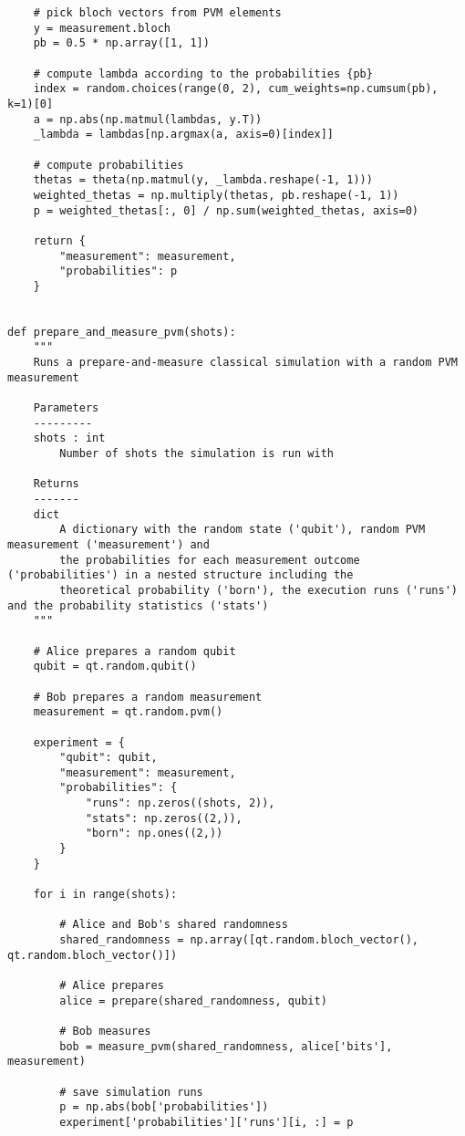\begin{verbatim}
    # pick bloch vectors from PVM elements
    y = measurement.bloch
    pb = 0.5 * np.array([1, 1])

    # compute lambda according to the probabilities {pb}
    index = random.choices(range(0, 2), cum_weights=np.cumsum(pb), k=1)[0]
    a = np.abs(np.matmul(lambdas, y.T))
    _lambda = lambdas[np.argmax(a, axis=0)[index]]

    # compute probabilities
    thetas = theta(np.matmul(y, _lambda.reshape(-1, 1)))
    weighted_thetas = np.multiply(thetas, pb.reshape(-1, 1))
    p = weighted_thetas[:, 0] / np.sum(weighted_thetas, axis=0)

    return {
        "measurement": measurement,
        "probabilities": p
    }


def prepare_and_measure_pvm(shots):
    """
    Runs a prepare-and-measure classical simulation with a random PVM measurement

    Parameters
    ---------
    shots : int
        Number of shots the simulation is run with

    Returns
    -------
    dict
        A dictionary with the random state ('qubit'), random PVM measurement ('measurement') and
        the probabilities for each measurement outcome ('probabilities') in a nested structure including the
        theoretical probability ('born'), the execution runs ('runs') and the probability statistics ('stats')
    """

    # Alice prepares a random qubit
    qubit = qt.random.qubit()

    # Bob prepares a random measurement
    measurement = qt.random.pvm()

    experiment = {
        "qubit": qubit,
        "measurement": measurement,
        "probabilities": {
            "runs": np.zeros((shots, 2)),
            "stats": np.zeros((2,)),
            "born": np.ones((2,))
        }
    }

    for i in range(shots):

        # Alice and Bob's shared randomness
        shared_randomness = np.array([qt.random.bloch_vector(), qt.random.bloch_vector()])

        # Alice prepares
        alice = prepare(shared_randomness, qubit)

        # Bob measures
        bob = measure_pvm(shared_randomness, alice['bits'], measurement)

        # save simulation runs
        p = np.abs(bob['probabilities'])
        experiment['probabilities']['runs'][i, :] = p


\end{verbatim}
